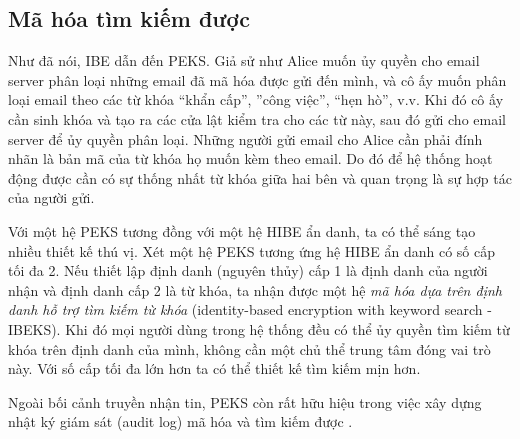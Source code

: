 \documentclass[class=report, crop=false]{standalone}
\begin{document}
		\subsection{Mã hóa tìm kiếm được}
			Như đã nói, IBE dẫn đến PEKS. Giả sử như Alice muốn ủy quyền cho email server phân loại những email đã mã hóa được gửi đến mình, và cô ấy muốn phân loại email theo các từ khóa ``khẩn cấp'', ''công việc'', ``hẹn hò'', v.v. Khi đó cô ấy cần sinh khóa và tạo ra các cửa lật kiểm tra cho các từ này, sau đó gửi cho email server để ủy quyền phân loại. Những người gửi email cho Alice cần phải đính nhãn là bản mã của từ khóa họ muốn kèm theo email. Do đó để hệ thống hoạt động được cần có sự thống nhất từ khóa giữa hai bên và quan trọng là sự hợp tác của người gửi.

			Với một hệ PEKS tương đồng với một hệ HIBE ẩn danh, ta có thể sáng tạo nhiều thiết kế thú vị. Xét một hệ PEKS tương ứng hệ HIBE ẩn danh có số cấp tối đa 2. Nếu thiết lập định danh (nguyên thủy) cấp 1 là định danh của người nhận và định danh cấp 2 là từ khóa, ta nhận được một hệ \textit{mã hóa dựa trên định danh hỗ trợ tìm kiếm từ khóa} (identity-based encryption with keyword search - IBEKS). Khi đó mọi người dùng trong hệ thống đều có thể ủy quyền tìm kiếm từ khóa trên định danh của mình, không cần một chủ thể trung tâm đóng vai trò này. Với số cấp tối đa lớn hơn ta có thể thiết kế tìm kiếm mịn hơn.

			Ngoài bối cảnh truyền nhận tin, PEKS còn rất hữu hiệu trong việc xây dựng nhật ký giám sát (audit log) mã hóa và tìm kiếm được \cite{DBLP:conf/ndss/WatersBDS04}.
\end{document}
